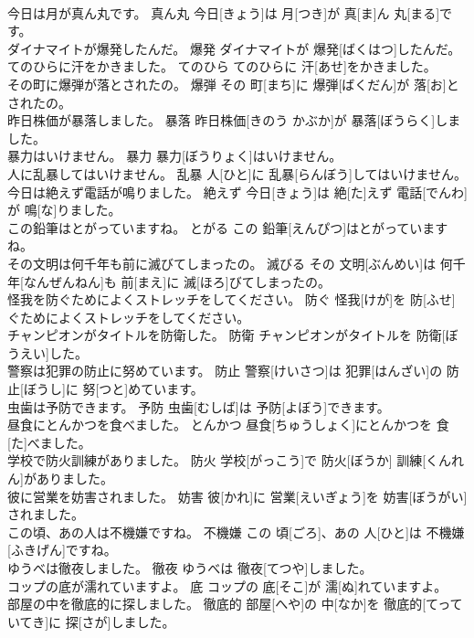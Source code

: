 \documentclass[8pt]{extreport}
\begin{document}
\begin{CJK}{UTF8}{min}
\\	今日は月が真ん丸です。	真ん丸	今日[きょう]は 月[つき]が 真[ま]ん 丸[まる]です。	
\\	ダイナマイトが爆発したんだ。	爆発	ダイナマイトが 爆発[ばくはつ]したんだ。	
\\	てのひらに汗をかきました。	てのひら	てのひらに 汗[あせ]をかきました。	
\\	その町に爆弾が落とされたの。	爆弾	その 町[まち]に 爆弾[ばくだん]が 落[お]とされたの。	
\\	昨日株価が暴落しました。	暴落	昨日株価[きのう かぶか]が 暴落[ぼうらく]しました。	
\\	暴力はいけません。	暴力	暴力[ぼうりょく]はいけません。	
\\	人に乱暴してはいけません。	乱暴	人[ひと]に 乱暴[らんぼう]してはいけません。	
\\	今日は絶えず電話が鳴りました。	絶えず	今日[きょう]は 絶[た]えず 電話[でんわ]が 鳴[な]りました。	
\\	この鉛筆はとがっていますね。	とがる	この 鉛筆[えんぴつ]はとがっていますね。	
\\	その文明は何千年も前に滅びてしまったの。	滅びる	その 文明[ぶんめい]は 何千年[なんぜんねん]も 前[まえ]に 滅[ほろ]びてしまったの。	
\\	怪我を防ぐためによくストレッチをしてください。	防ぐ	怪我[けが]を 防[ふせ]ぐためによくストレッチをしてください。	
\\	チャンピオンがタイトルを防衛した。	防衛	チャンピオンがタイトルを 防衛[ぼうえい]した。	
\\	警察は犯罪の防止に努めています。	防止	警察[けいさつ]は 犯罪[はんざい]の 防止[ぼうし]に 努[つと]めています。	
\\	虫歯は予防できます。	予防	虫歯[むしば]は 予防[よぼう]できます。	
\\	昼食にとんかつを食べました。	とんかつ	昼食[ちゅうしょく]にとんかつを 食[た]べました。	
\\	学校で防火訓練がありました。	防火	学校[がっこう]で 防火[ぼうか] 訓練[くんれん]がありました。	
\\	彼に営業を妨害されました。	妨害	彼[かれ]に 営業[えいぎょう]を 妨害[ぼうがい]されました。	
\\	この頃、あの人は不機嫌ですね。	不機嫌	この 頃[ごろ]、あの 人[ひと]は 不機嫌[ふきげん]ですね。	
\\	ゆうべは徹夜しました。	徹夜	ゆうべは 徹夜[てつや]しました。	
\\	コップの底が濡れていますよ。	底	コップの 底[そこ]が 濡[ぬ]れていますよ。	
\\	部屋の中を徹底的に探しました。	徹底的	部屋[へや]の 中[なか]を 徹底的[てっていてき]に 探[さが]しました。	

\end{CJK}
\end{document}
